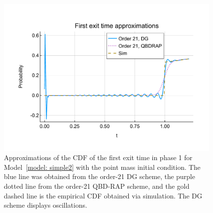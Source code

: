 \begin{figure}
	\centering
	\includegraphics[width=\textwidth]{chapter6/figs/hitting_times_model/hitting_times/point_mass/cdf_order21DG_and_sims.pdf}%
	\caption{Approximations of the CDF of the first exit time in phase 1 for Model~\ref{model: simple2} with the point mass initial condition. The blue line was obtained from the order-21 DG scheme, the purple dotted line from the order-21 QBD-RAP scheme, and the gold dashed line is the empirical CDF obtained via simulation. The DG scheme displays oscillations. } 
	\label{fig: hitting time oscillation} 
\end{figure}

